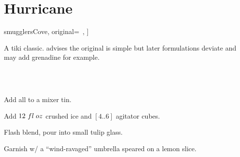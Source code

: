 \section[Hurricane]{
    Hurricane
}

\begin{recipestats}[
        servings=1,
        preptime=5~\minute,
        source=\citeauthor{smugglersCove}~\cite[p.~68]{smugglersCove},
        original=\citeauthor{beachbumBerryRemixed}~\cite{beachbumBerryRemixed},
    ]
\end{recipestats}

\begin{recipeabstract}
    A tiki classic.
    \citeauthor{smugglersCove} advises the original is simple but later
    formulations deviate and may add grenadine for example.
\end{recipeabstract}

\begin{ingredientcolumns}[1]
    \begin{ingredientblock}
        \\
        \\
    \end{ingredientblock}
\end{ingredientcolumns}

\begin{preparation}
\item Add all to a mixer tin.
\item Add $12~fl\;oz$ crushed ice and $[4..6]$ agitator cubes.
\item Flash blend, pour into small tulip glass.
\item Garnish w/ a ``wind-ravaged'' umbrella speared on a lemon slice.
\end{preparation}

\recipeend%
